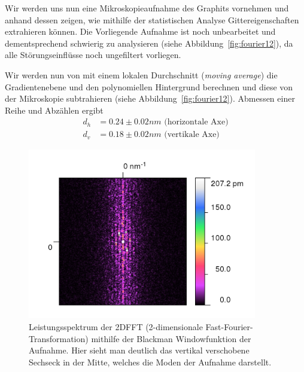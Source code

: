 Wir werden uns nun eine Mikroskopieaufnahme des Graphits vornehmen und anhand dessen zeigen,
wie mithilfe der statistischen Analyse Gittereigenschaften extrahieren können. 
Die Vorliegende Aufnahme ist noch unbearbeitet
und dementsprechend schwierig zu analysieren (siehe Abbildung~\ref{fig:fourier12}), da alle
Störungseinflüsse noch ungefiltert vorliegen.


Wir werden nun von mit einem lokalen Durchschnitt (\textit{moving average})
die Gradientenebene und den polynomiellen Hintergrund berechnen und diese von der Mikroskopie
subtrahieren (siehe Abbildung~\ref{fig:fourier12}). 
Abmessen einer Reihe und Abzählen ergibt
\begin{align*}
    d_h &= 0.24 \pm 0.02 nm \mbox{ (horizontale Axe)}\\
    d_v &= 0.18 \pm 0.02 nm \mbox{ (vertikale Axe)}
\end{align*}


\begin{figure}  
    \includegraphics[width=10cm]{pics/fourier3}
  \caption{Leistungsspektrum der 2DFFT (2-dimensionale Fast-Fourier-Transformation) 
      mithilfe der Blackman Windowfunktion
  der Aufnahme. Hier sieht man deutlich das vertikal verschobene Sechseck in der Mitte,
  welches die Moden der Aufnahme darstellt.}
\label{fig:fourier3}
\end{figure}

